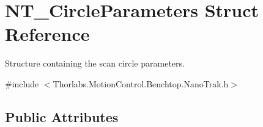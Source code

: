 \hypertarget{struct_n_t___circle_parameters}{}\section{N\+T\+\_\+\+Circle\+Parameters Struct Reference}
\label{struct_n_t___circle_parameters}


Structure containing the scan circle parameters.  




{\ttfamily \#include $<$Thorlabs.\+Motion\+Control.\+Benchtop.\+Nano\+Trak.\+h$>$}

\subsection*{Public Attributes}
